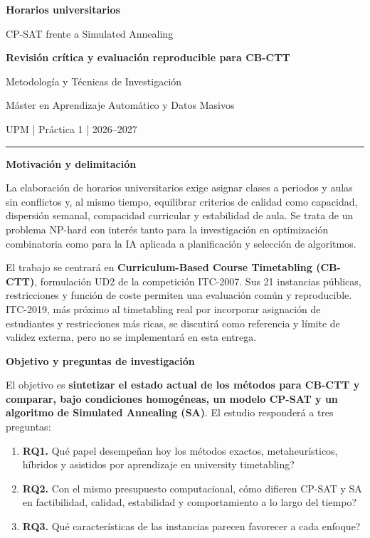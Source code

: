 \documentclass[10pt]{article}
\newcommand{\sectiontitle}[1]{%
  \vspace{1.2mm}%
  {\color{burdeos}\fontsize{11.5}{13}\selectfont\bfseries #1}\par
  \vspace{0.4mm}{\color{burdeos}\rule{\linewidth}{0.75pt}}\vspace{0.5mm}
}
\begin{document}
\thispagestyle{empty}
\noindent\begin{minipage}[t][\textheight][t]{\textwidth}

\begin{minipage}[c]{0.68\textwidth}
  {\color{burdeososcuro}\fontsize{18.5}{20.5}\selectfont\bfseries
  Horarios universitarios\par CP-SAT frente a Simulated Annealing\par}
  \vspace{0.7mm}
  {\fontsize{11.5}{13}\selectfont\bfseries
  Revisi\'on cr\'itica y evaluaci\'on reproducible para CB-CTT\par}
\end{minipage}\hfill
\begin{minipage}[c]{0.285\textwidth}
  \raggedleft\small\color{gris}
  Metodolog\'ia y T\'ecnicas de Investigaci\'on\par
  M\'aster en Aprendizaje Autom\'atico y Datos Masivos\par
  UPM | Pr\'actica 1 | 2026--2027
\end{minipage}

\vspace{1.8mm}
{\color{burdeos}\rule{\textwidth}{1.5pt}}

\sectiontitle{Motivaci\'on y delimitaci\'on}
\small\justifying
La elaboraci\'on de horarios universitarios exige asignar clases a periodos y aulas sin conflictos y, al mismo tiempo, equilibrar criterios de calidad como capacidad, dispersi\'on semanal, compacidad curricular y estabilidad de aula. Se trata de un problema NP-hard con inter\'es tanto para la investigaci\'on en optimizaci\'on combinatoria como para la IA aplicada a planificaci\'on y selecci\'on de algoritmos.

El trabajo se centrar\'a en \textbf{Curriculum-Based Course Timetabling (CB-CTT)}, formulaci\'on UD2 de la competici\'on ITC-2007. Sus 21 instancias p\'ublicas, restricciones y funci\'on de coste permiten una evaluaci\'on com\'un y reproducible. ITC-2019, m\'as pr\'oximo al timetabling real por incorporar asignaci\'on de estudiantes y restricciones m\'as ricas, se discutir\'a como referencia y l\'imite de validez externa, pero no se implementar\'a en esta entrega.

\sectiontitle{Objetivo y preguntas de investigaci\'on}
El objetivo es \textbf{sintetizar el estado actual de los m\'etodos para CB-CTT y comparar, bajo condiciones homog\'eneas, un modelo CP-SAT y un algoritmo de Simulated Annealing (SA)}. El estudio responder\'a a tres preguntas:
\begin{enumerate}
  \item \textbf{RQ1.} \textquestiondown Qu\'e papel desempe\~nan hoy los m\'etodos exactos, metaheur\'isticos, h\'ibridos y asistidos por aprendizaje en university timetabling?
  \item \textbf{RQ2.} Con el mismo presupuesto computacional, \textquestiondown c\'omo difieren CP-SAT y SA en factibilidad, calidad, estabilidad y comportamiento a lo largo del tiempo?
  \item \textbf{RQ3.} \textquestiondown Qu\'e caracter\'isticas de las instancias parecen favorecer a cada enfoque?
\end{enumerate}


\end{minipage}
\end{document}
